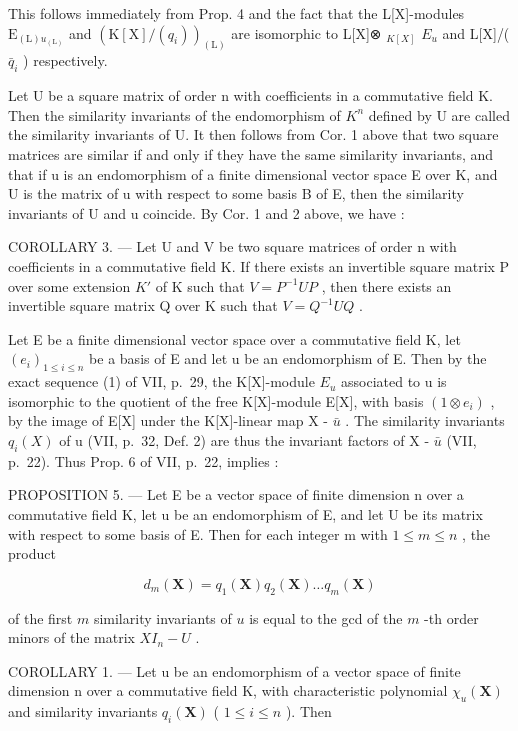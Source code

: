 This follows immediately from Prop. 4 and the fact that the L{[}X{]}-modules \(\mathrm{E}_{(\mathrm{L})u_{(\mathrm{L})}}\) and \((\mathrm{K}[\mathrm{X}]/(q_{i}))_{(\mathrm{L})}\) are isomorphic to L{[}X{]}⊗ \(_{K[X]}\) \(E_{u}\) and L{[}X{]}/( \(\bar{q}_{i}\) ) respectively.

Let U be a square matrix of order n with coefficients in a commutative field K. Then the similarity invariants of the endomorphism of \(K^{n}\) defined by U are called the similarity invariants of U. It then follows from Cor. 1 above that two square matrices are similar if and only if they have the same similarity invariants, and that if u is an endomorphism of a finite dimensional vector space E over K, and U is the matrix of u with respect to some basis B of E, then the similarity invariants of U and u coincide. By Cor. 1 and 2 above, we have :

COROLLARY 3. --- Let U and V be two square matrices of order n with coefficients in a commutative field K. If there exists an invertible square matrix P over some extension \(K'\) of K such that \(V = P^{-1}UP\) , then there exists an invertible square matrix Q over K such that \(V = Q^{-1}UQ\) .

Let E be a finite dimensional vector space over a commutative field K, let \((e_{i})_{1 \leq i \leq n}\) be a basis of E and let u be an endomorphism of E. Then by the exact sequence (1) of VII, p.~29, the K{[}X{]}-module \(E_{u}\) associated to u is isomorphic to the quotient of the free K{[}X{]}-module E{[}X{]}, with basis \((1 \otimes e_{i})\) , by the image of E{[}X{]} under the K{[}X{]}-linear map X - \(\bar{u}\) . The similarity invariants \(q_{i}(X)\) of u (VII, p.~32, Def. 2) are thus the invariant factors of X - \(\bar{u}\) (VII, p.~22). Thus Prop. 6 of VII, p.~22, implies :

PROPOSITION 5. --- Let E be a vector space of finite dimension n over a commutative field K, let u be an endomorphism of E, and let U be its matrix with respect to some basis of E. Then for each integer m with \(1 \leq m \leq n\) , the product

\[
d _ {m} (\mathbf {X}) = q _ {1} (\mathbf {X}) q _ {2} (\mathbf {X}) \dots q _ {m} (\mathbf {X})
\]

of the first \(m\) similarity invariants of \(u\) is equal to the gcd of the \(m\) -th order minors of the matrix \(XI_{n} - U\) .

COROLLARY 1. --- Let u be an endomorphism of a vector space of finite dimension n over a commutative field K, with characteristic polynomial \(\chi_{u}(\mathbf{X})\) and similarity invariants \(q_{i}(\mathbf{X})\) ( \(1 \leqslant i \leqslant n\) ). Then

